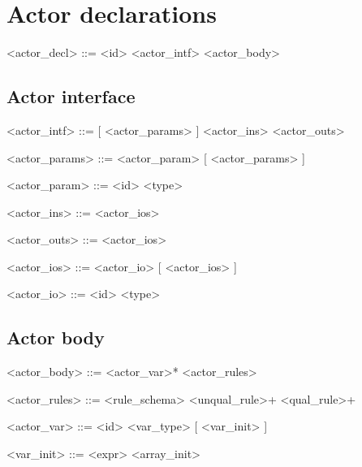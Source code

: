 \section*{Actor declarations}

\begin{grammar}
<actor_decl> ::=  <id> <actor_intf> <actor_body>
\end{grammar}

\subsection*{Actor interface}

\begin{grammar}
<actor_intf> ::= [ \lit{(} <actor_params> \lit{)} ]
                  \lit{(} <actor_ins> \lit{)}  \lit{(} <actor_outs> \lit{)}

<actor_params> ::= <actor_param> [ \lit{,} <actor_params> ]

<actor_param> ::= <id> \lit{:} <type>

<actor_ins> ::= <actor_ios>

<actor_outs> ::= <actor_ios>

<actor_ios> ::= <actor_io> [ \lit{,} <actor_ios> ]

<actor_io> ::= <id> \lit{:} <type>
\end{grammar}

\subsection*{Actor body}

\begin{grammar}
<actor_body> ::= <actor_var>*  <actor_rules>

<actor_rules> ::= <rule_schema> <unqual_rule>+
                \alt <qual_rule>+

<actor_var> ::=  <id> \lit{:} <var_type> [ \lit{=} <var_init> ]

<var_init> ::= <expr>
             \alt <array_init>
\end{grammar}

